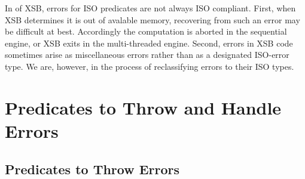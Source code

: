 In \version{} of XSB, errors for ISO predicates are not always ISO
compliant.  First, when XSB determines it is out of avalable memory,
recovering from such an error may be difficult at best.  Accordingly
the computation is aborted in the sequential engine, or XSB exits in
the multi-threaded engine.  Second, errors in XSB code sometimes arise
as miscellaneous errors rather than as a designated ISO-error type.
We are, however, in the process of reclassifying errors to their ISO
types.

\section{Predicates to Throw and Handle Errors}

\subsection{Predicates to Throw Errors}

